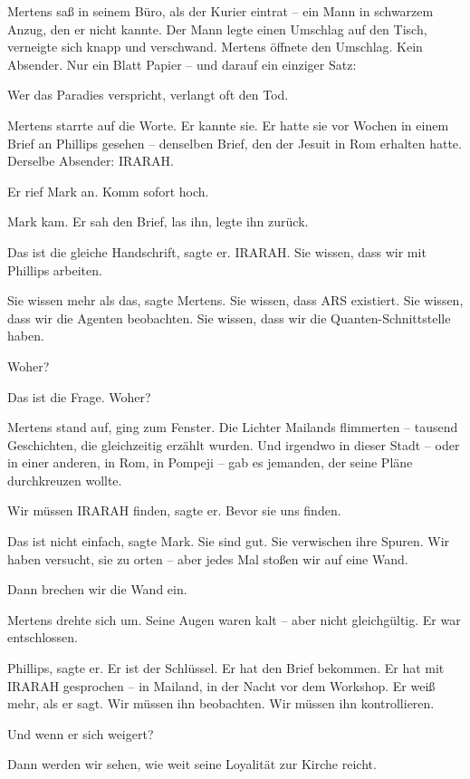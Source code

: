 \documentclass[
]{article}
\begin{document}
Mertens saß in seinem Büro, als der Kurier eintrat -- ein Mann in schwarzem Anzug, den er nicht kannte. Der Mann legte einen Umschlag auf den Tisch, verneigte sich knapp und verschwand. Mertens öffnete den Umschlag. Kein Absender. Nur ein Blatt Papier -- und darauf ein einziger Satz:

\glqq Wer das Paradies verspricht, verlangt oft den Tod.\grqq

Mertens starrte auf die Worte. Er kannte sie. Er hatte sie vor Wochen in einem Brief an Phillips gesehen -- denselben Brief, den der Jesuit in Rom erhalten hatte. Derselbe Absender: IRARAH.

Er rief Mark an. \glqq Komm sofort hoch.\grqq

Mark kam. Er sah den Brief, las ihn, legte ihn zurück.

\glqq Das ist die gleiche Handschrift\grqq, sagte er. \glqq IRARAH. Sie wissen, dass wir mit Phillips arbeiten.\grqq

\glqq Sie wissen mehr als das\grqq, sagte Mertens. \glqq Sie wissen, dass ARS existiert. Sie wissen, dass wir die Agenten beobachten. Sie wissen, dass wir die Quanten-Schnittstelle haben.\grqq

\glqq Woher?\grqq

\glqq Das ist die Frage. Woher?\grqq

Mertens stand auf, ging zum Fenster. Die Lichter Mailands flimmerten -- tausend Geschichten, die gleichzeitig erzählt wurden. Und irgendwo in dieser Stadt -- oder in einer anderen, in Rom, in Pompeji -- gab es jemanden, der seine Pläne durchkreuzen wollte.

\glqq Wir müssen IRARAH finden\grqq, sagte er. \glqq Bevor sie uns finden.\grqq

\glqq Das ist nicht einfach\grqq, sagte Mark. \glqq Sie sind gut. Sie verwischen ihre Spuren. Wir haben versucht, sie zu orten -- aber jedes Mal stoßen wir auf eine Wand.\grqq

\glqq Dann brechen wir die Wand ein.\grqq

Mertens drehte sich um. Seine Augen waren kalt -- aber nicht gleichgültig. Er war entschlossen.

\glqq Phillips\grqq, sagte er. \glqq Er ist der Schlüssel. Er hat den Brief bekommen. Er hat mit IRARAH gesprochen -- in Mailand, in der Nacht vor dem Workshop. Er weiß mehr, als er sagt. Wir müssen ihn beobachten. Wir müssen ihn kontrollieren.\grqq

\glqq Und wenn er sich weigert?\grqq

\glqq Dann werden wir sehen, wie weit seine Loyalität zur Kirche reicht.\grqq
\end{document}
